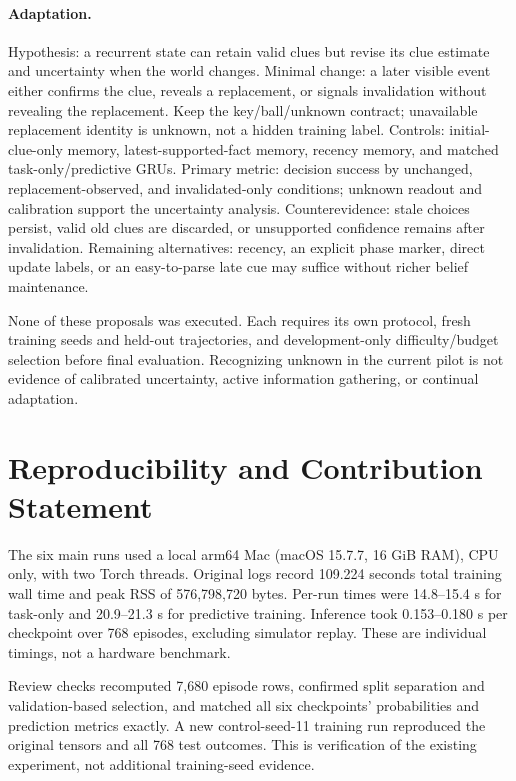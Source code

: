 \documentclass[11pt]{article}
\begin{document}
\paragraph{Adaptation.} Hypothesis: a recurrent state can retain valid clues but revise its clue estimate and uncertainty when the world changes. Minimal change: a later visible event either confirms the clue, reveals a replacement, or signals invalidation without revealing the replacement. Keep the key/ball/unknown contract; unavailable replacement identity is unknown, not a hidden training label. Controls: initial-clue-only memory, latest-supported-fact memory, recency memory, and matched task-only/predictive GRUs. Primary metric: decision success by unchanged, replacement-observed, and invalidated-only conditions; unknown readout and calibration support the uncertainty analysis. Counterevidence: stale choices persist, valid old clues are discarded, or unsupported confidence remains after invalidation. Remaining alternatives: recency, an explicit phase marker, direct update labels, or an easy-to-parse late cue may suffice without richer belief maintenance.

None of these proposals was executed. Each requires its own protocol, fresh training seeds and held-out trajectories, and development-only difficulty/budget selection before final evaluation. Recognizing unknown in the current pilot is not evidence of calibrated uncertainty, active information gathering, or continual adaptation.

\section{Reproducibility and Contribution Statement}

The six main runs used a local arm64 Mac (macOS 15.7.7, 16 GiB RAM), CPU only, with two Torch threads. Original logs record 109.224 seconds total training wall time and peak RSS of 576,798,720 bytes. Per-run times were 14.8--15.4 s for task-only and 20.9--21.3 s for predictive training. Inference took 0.153--0.180 s per checkpoint over 768 episodes, excluding simulator replay. These are individual timings, not a hardware benchmark.

Review checks recomputed 7,680 episode rows, confirmed split separation and validation-based selection, and matched all six checkpoints' probabilities and prediction metrics exactly. A new control-seed-11 training run reproduced the original tensors and all 768 test outcomes. This is verification of the existing experiment, not additional training-seed evidence.
\end{document}
